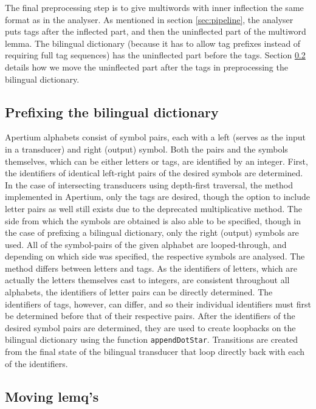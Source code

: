 \documentclass[10pt, a4paper]{article}
\begin{document}
The final preprocessing step is to give multiwords with inner
inflection the same format as in the analyser. As mentioned in section
\ref{sec:pipeline}, the analyser puts tags after the inflected part,
and then the uninflected part of the multiword lemma. The bilingual
dictionary (because it has to allow tag prefixes instead of requiring
full tag sequences) has the uninflected part before the tags. Section
\ref{sec:lemqmove} details how we move the uninflected part after the
tags in preprocessing the bilingual dictionary.

\subsection{Prefixing the bilingual dictionary}

Apertium alphabets consist of symbol pairs, each with a left (serves
as the input in a transducer) and right (output) symbol. Both the
pairs and the symbols themselves, which can be either letters or tags,
are identified by an integer. First, the identifiers of identical
left-right pairs of the desired symbols are determined. In the case of
intersecting transducers using depth-first traversal, the method
implemented in Apertium, only the tags are desired, though the option
to include letter pairs as well still exists due to the deprecated
multiplicative method. The side from which the symbols are obtained is
also able to be specified, though in the case of prefixing a bilingual
dictionary, only the right (output) symbols are used. All of the
symbol-pairs of the given alphabet are looped-through, and depending
on which side was specified, the respective symbols are analysed. The
method differs between letters and tags. As the identifiers of
letters, which are actually the letters themselves cast to integers,
are consistent throughout all alphabets, the identifiers of letter
pairs can be directly determined. The identifiers of tags, however,
can differ, and so their individual identifiers must first be
determined before that of their respective pairs. After the
identifiers of the desired symbol pairs are determined, they are used
to create loopbacks on the bilingual dictionary using the function
\texttt{appendDotStar}. Transitions are created from the final state
of the bilingual transducer that loop directly back with each of the
identifiers.

\subsection{Moving lemq's}
\label{sec:lemqmove}
\end{document}
